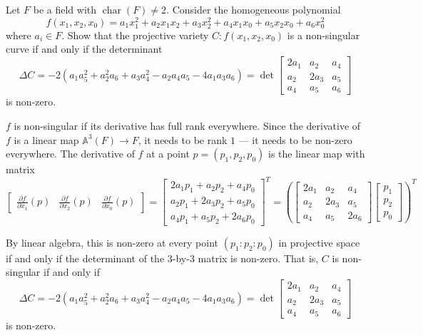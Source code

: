 \documentclass[12 pt, letterpaper]{hmcpset}
\begin{document}
\begin{problem}[Problem 1.]
	Let $F$ be a field with $\operatorname{char}(F) \neq 2$. Consider the homogeneous polynomial
	\[
		f(x_{1}, x_{2}, x_{0}) = a_{1} x_{1}^{2} + a_{2} x_{1} x_{2} + a_{3} x_{2}^{2} + a_{4} x_{1} x_{0} + a_{5} x_{2} x_{0} + a_{6} x_{0}^{2}
	\]
	where $a_{i} \in F$. Show that the projective variety $C : f(x_{1}, x_{2}, x_{0})$ is a non-singular curve if and only if the determinant
	\[
		\Delta C = -2(a_{1} a_{5}^{2} + a_{2}^{2} a_{6} + a_{3} a_{4}^{2} - a_{2} a_{4} a_{5} - 4 a_{1} a_{3} a_{6}) = \det \begin{bmatrix}
			2 a_{1} & a_{2} & a_{4} \\
			a_{2} & 2 a_{3} & a_{5} \\
			a_{4} & a_{5} & a_{6}
		\end{bmatrix}
	\]
	is non-zero.
\end{problem}

\begin{solution}
	$f$ is non-singular if its derivative has full rank everywhere. Since the derivative of $f$ is a linear map $\mathbb{A}^{3}(F) \to F$, it needs to be rank $1$ --- it needs to be non-zero everywhere. The derivative of $f$ at a point $p = (p_{1}, p_{2}, p_{0})$ is the linear map with matrix
	\[
		\begin{bmatrix}
			\frac{\partial f}{\partial x_{1}}(p) & \frac{\partial f}{\partial x_{2}}(p) & \frac{\partial f}{\partial x_{0}}(p)
		\end{bmatrix} = \begin{bmatrix}
			2 a_{1} p_{1} + a_{2} p_{2} + a_{4} p_{0} \\
			a_{2} p_{1} + 2 a_{3} p_{2} + a_{5} p_{0} \\
			a_{4} p_{1} + a_{5} p_{2} + 2 a_{6} p_{0}
		\end{bmatrix}^{T} = \left ( \begin{bmatrix}
			2 a_{1} & a_{2} & a_{4} \\
			a_{2} & 2 a_{3} & a_{5} \\
			a_{4} & a_{5} & 2 a_{6}
		\end{bmatrix} \begin{bmatrix}
			p_{1} \\
			p_{2} \\
			p_{0}
		\end{bmatrix} \right )^{T}
	\]

	By linear algebra, this is non-zero at every point $(p_{1} : p_{2} : p_{0})$ in projective space if and only if the determinant of the $3$-by-$3$ matrix is non-zero. That is, $C$ is non-singular if and only if
	\[
		\Delta C = -2(a_{1} a_{5}^{2} + a_{2}^{2} a_{6} + a_{3} a_{4}^{2} - a_{2} a_{4} a_{5} - 4 a_{1} a_{3} a_{6}) = \det \begin{bmatrix}
			2 a_{1} & a_{2} & a_{4} \\
			a_{2} & 2 a_{3} & a_{5} \\
			a_{4} & a_{5} & a_{6}
		\end{bmatrix}
	\]
	is non-zero.
\end{solution}
\end{document}
